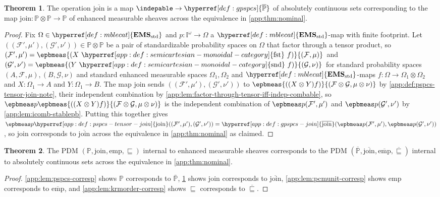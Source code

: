 \documentclass[
  sigconf,
  screen, ]{acmart}
\theoremstyle{definition}
\newtheorem{theorem}{Theorem}[section]
\newcommand\calF{\mathcal F}
\newcommand\calG{\mathcal G}
\newcommand\nref[2]{\hyperref[#1]{#2}} \newcommand\checkhigh{{\huge{\color{red}\textbf{TODO: check}}}}
\newcommand\scmfst{\mathop{\nref{app:def:semicartesian-monoidal-category}{\mathrm{fst}}}}
\newcommand\scmsnd{\mathop{\nref{app:def:semicartesian-monoidal-category}{\mathrm{snd}}}}
\newcommand\shotimes{\mathop{\otimes}}
\newcommand\texhcube{{{{\mathbb I}^\omega}}}
\newcommand\hcube{{\nref{def:hcube}{\texhcube}}}
\newcommand\texagoodname{absolutely continuous set}
\newcommand\agoodname{\texagoodname}
\newcommand\sheafcatadj{enhanced measurable}
\newcommand\texgoodsheaves{\sheafcatadj{} sheaves}
\newcommand\goodsheaves{\texgoodsheaves}
\newcommand\texStdMble{\mathbf{EMS}_{\rm std}}
\newcommand\StdMble{{\nref{def:mblecat}{\texStdMble}}}
\newcommand\pcmjoin{{\nref{app:def:pspcs-tensor-join}{\mathrm{join}}}}
\newcommand\pcmunit{{\nref{app:def:pspcs-join-unit}{\mathrm{emp}}}}
\newcommand\texpspcs{\mathbb P}
\newcommand\pspcs{{\nref{def:mble-pspcs}{\texpspcs}}}
\newcommand\gpcmjoin{{\nref{app:def:gpspcs-join}{\overline{\mathrm{join}}}}}
\newcommand\gpcmunit{{\nref{app:def:emp-gpspcs}{\overline{\mathrm{emp}}}}}
\newcommand\gkrmorder{\mathbin{\nref{app:def:pspc-ord}{\overline{\sqsubseteq}}}}
\newcommand\texgpspcs{\overline{\mathbb P}}
\newcommand\gpspcs{{\nref{def:gpspcs}{\texgpspcs}}}
\newcommand\krmorder{\mathrel{\nref{app:def:mble-pspcs-ordering}{\sqsubseteq}}}
\begin{document}
\begin{theorem} \label{app:thm:pcmjoin-corresp}
  The operation $\gpcmjoin$ is a map $\indepable\to\gpspcs$
  of \agoodname{s} corresponding to
  the map $\pcmjoin : \pspcs\shotimes\pspcs\to\pspcs$
  of \goodsheaves{}
  across the equivalence in \cref{app:thm:nominal}.
\end{theorem}
\begin{proof}
  Fix $\Omega\in\StdMble$ and $p : \hcube\to\Omega$
  a $\StdMble$-map with finite footprint.
  Let $((\calF',\mu'),(\calG',\nu'))\in\pspcs\shotimes\pspcs$
  be a pair of standardizable probability spaces
  on $\Omega$ that factor through a tensor product,
  so $(\calF',\mu') = \epbmeas {(X\,\scmfst\,f)}{(\calF,\mu)}$
  and $(\calG',\nu') = \epbmeas {(Y\,\scmsnd\,f)}{(\calG,\nu)}$
  for standard probability spaces $(A,\calF,\mu),(B,\calG,\nu)$
  and standard enhanced measurable spaces $\Omega_1,\Omega_2$
  and $\StdMble$-maps 
  $f : \Omega\to\Omega_1\otimes\Omega_2$
  and $X:\Omega_1\to A$ and $Y:\Omega_1\to B$.
  The map $\pcmjoin$ sends $((\calF',\mu'),(\calG',\nu'))$
  to $\epbmeas {((X\otimes Y)f)}{(\calF\otimes\calG,\mu\otimes\nu)}$
  by \cref{app:def:pspcs-tensor-join-note},
  their independent combination
  by \cref{app:lem:factor-through-tensor-iff-indep-combable},
  so $\epbmeas p{\epbmeas {((X\otimes Y)f)}{(\calF\otimes\calG,\mu\otimes\nu)}}$
  is the independent combination of $\epbmeas p{(\calF',\mu')}$
  and $\epbmeas p{(\calG',\nu')}$ by \cref{app:lem:icomb-stablepb}.
  Putting this together gives
  $\epbmeas p{\pcmjoin((\calF',\mu'),(\calG',\nu'))}
  = \gpcmjoin(\epbmeas p{(\calF',\mu')},\epbmeas p{(\calG',\nu')})$,
  so $\pcmjoin$ corresponds to $\gpcmjoin$ across the equivalence
  in \cref{app:thm:nominal} as claimed.
\end{proof}

\begin{theorem} \label{app:thm:krm-corresp}
The PDM $(\pspcs,\pcmjoin,\pcmunit,\krmorder)$
internal to \goodsheaves{}
corresponds to the PDM $(\gpspcs,\gpcmjoin,\gpcmunit,\gkrmorder)$
internal to \agoodname{s}
across the equivalence in \cref{app:thm:nominal}.
\end{theorem}
\begin{proof}
  \cref{app:lem:pspcs-corresp} shows $\pspcs$ corresponds to $\gpspcs$,
  \cref{app:thm:pcmjoin-corresp} shows $\pcmjoin$ corresponds to $\gpcmjoin$,
  \cref{app:lem:pcmunit-corresp} shows $\pcmunit$ corresponds to $\gpcmunit$,
  and \cref{app:lem:krmorder-corresp} shows $\krmorder$ corresponds to $\gkrmorder$.
\end{proof} \fi
\end{document}
